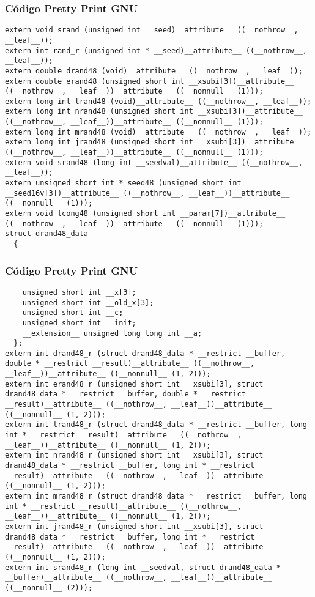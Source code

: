 \documentclass{beamer}
\begin{document}
\begin{frame}[fragile]
\frametitle{C\'odigo Pretty Print GNU}
\begin{verbatim}
extern void srand (unsigned int __seed)__attribute__ ((__nothrow__, __leaf__));
extern int rand_r (unsigned int * __seed)__attribute__ ((__nothrow__, __leaf__));
extern double drand48 (void)__attribute__ ((__nothrow__, __leaf__));
extern double erand48 (unsigned short int __xsubi[3])__attribute__ ((__nothrow__, __leaf__))__attribute__ ((__nonnull__ (1)));
extern long int lrand48 (void)__attribute__ ((__nothrow__, __leaf__));
extern long int nrand48 (unsigned short int __xsubi[3])__attribute__ ((__nothrow__, __leaf__))__attribute__ ((__nonnull__ (1)));
extern long int mrand48 (void)__attribute__ ((__nothrow__, __leaf__));
extern long int jrand48 (unsigned short int __xsubi[3])__attribute__ ((__nothrow__, __leaf__))__attribute__ ((__nonnull__ (1)));
extern void srand48 (long int __seedval)__attribute__ ((__nothrow__, __leaf__));
extern unsigned short int * seed48 (unsigned short int __seed16v[3])__attribute__ ((__nothrow__, __leaf__))__attribute__ ((__nonnull__ (1)));
extern void lcong48 (unsigned short int __param[7])__attribute__ ((__nothrow__, __leaf__))__attribute__ ((__nonnull__ (1)));
struct drand48_data
  {
    \end{verbatim}
\end{frame}
\begin{frame}[fragile]
\frametitle{C\'odigo Pretty Print GNU}
\begin{verbatim}
    unsigned short int __x[3];
    unsigned short int __old_x[3];
    unsigned short int __c;
    unsigned short int __init;
    __extension__ unsigned long long int __a;
  };
extern int drand48_r (struct drand48_data * __restrict __buffer, double * __restrict __result)__attribute__ ((__nothrow__, __leaf__))__attribute__ ((__nonnull__ (1, 2)));
extern int erand48_r (unsigned short int __xsubi[3], struct drand48_data * __restrict __buffer, double * __restrict __result)__attribute__ ((__nothrow__, __leaf__))__attribute__ ((__nonnull__ (1, 2)));
extern int lrand48_r (struct drand48_data * __restrict __buffer, long int * __restrict __result)__attribute__ ((__nothrow__, __leaf__))__attribute__ ((__nonnull__ (1, 2)));
extern int nrand48_r (unsigned short int __xsubi[3], struct drand48_data * __restrict __buffer, long int * __restrict __result)__attribute__ ((__nothrow__, __leaf__))__attribute__ ((__nonnull__ (1, 2)));
extern int mrand48_r (struct drand48_data * __restrict __buffer, long int * __restrict __result)__attribute__ ((__nothrow__, __leaf__))__attribute__ ((__nonnull__ (1, 2)));
extern int jrand48_r (unsigned short int __xsubi[3], struct drand48_data * __restrict __buffer, long int * __restrict __result)__attribute__ ((__nothrow__, __leaf__))__attribute__ ((__nonnull__ (1, 2)));
extern int srand48_r (long int __seedval, struct drand48_data * __buffer)__attribute__ ((__nothrow__, __leaf__))__attribute__ ((__nonnull__ (2)));
\end{verbatim}
\end{frame}
\end{document}
